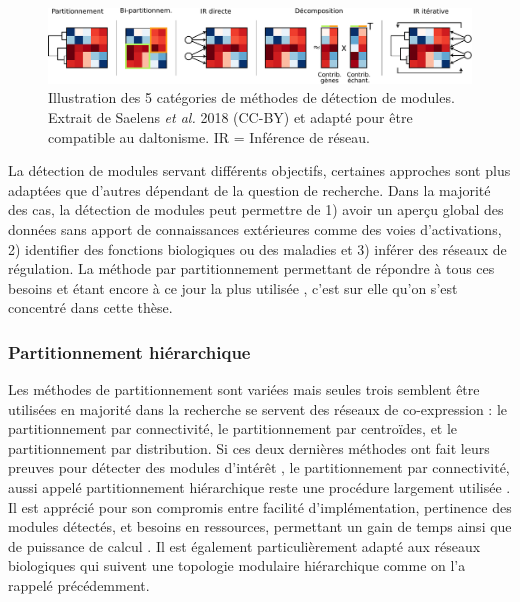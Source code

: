 \begin{figure}[h!]
    \centering
    \includegraphics[width=\textwidth]{img/intro/3_coexpr/intro_3_coexpr_category_detection_module.pdf}
    \caption[Illustration des 5 catégories de méthodes de détection de modules.]{Illustration des 5 catégories de méthodes de détection de modules. Extrait de Saelens \textit{et al.} 2018 (CC-BY) \cite{Saelens2018} et adapté pour être compatible au daltonisme. IR = Inférence de réseau.}
    \label{fig:category_detection_module}
\end{figure}

La détection de modules servant différents objectifs, certaines approches sont plus adaptées que d'autres dépendant de la question de recherche. Dans la majorité des cas, la détection de modules peut permettre de 1) avoir un aperçu global des données sans apport de connaissances extérieures comme des voies d'activations, 2) identifier des fonctions biologiques ou des maladies et 3) inférer des réseaux de régulation. La méthode par partitionnement permettant de répondre à tous ces besoins \cite{Filteau2013,Sundarrajan2016,Kogelman2014} et étant encore à ce jour la plus utilisée \cite{Saelens2018}, c'est sur elle qu'on s'est concentré dans cette thèse.

\subsubsection{Partitionnement hiérarchique}

Les méthodes de partitionnement sont variées mais seules trois semblent être utilisées en majorité dans la recherche se servent des réseaux de co-expression : le partitionnement par connectivité, le partitionnement par centroïdes, et le partitionnement par distribution. Si ces deux dernières méthodes ont fait leurs preuves pour détecter des modules d'intérêt \cite{Ruan2006Dec,Shi2010Dec, Rau2018}, le partitionnement par connectivité, aussi appelé partitionnement hiérarchique reste une procédure largement utilisée \cite{Tang2018, Mao2009, Rotival2013}. Il est apprécié pour son compromis entre facilité d'implémentation, pertinence des modules détectés, et besoins en ressources, permettant un gain de temps ainsi que de puissance de calcul \cite{Saelens2018}. Il est également particulièrement adapté aux réseaux biologiques qui suivent une topologie modulaire hiérarchique comme on l'a rappelé précédemment. 

